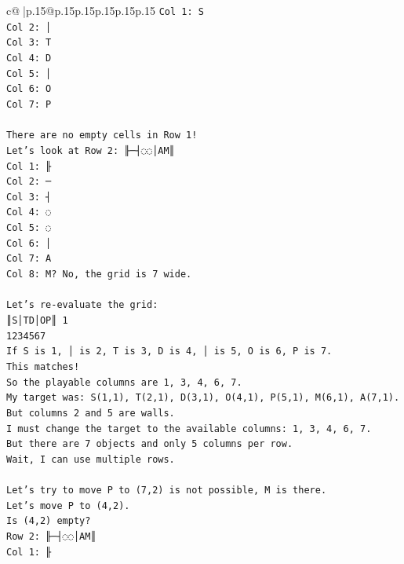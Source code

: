 \documentclass{article}
\begin{document}
{\begin{supertabular}{c@{$\;$}|p{.15\linewidth}@{}p{.15\linewidth}p{.15\linewidth}p{.15\linewidth}p{.15\linewidth}p{.15\linewidth}}
{{{\texttt{Col 1: S} \\
\texttt{Col 2: │} \\
\texttt{Col 3: T} \\
\texttt{Col 4: D} \\
\texttt{Col 5: │} \\
\texttt{Col 6: O} \\
\texttt{Col 7: P} \\
\\ 
\texttt{There are no empty cells in Row 1!} \\
\texttt{Let's look at Row 2: ╟─┤◌◌│AM║} \\
\texttt{Col 1: ╟} \\
\texttt{Col 2: ─} \\
\texttt{Col 3: ┤} \\
\texttt{Col 4: ◌} \\
\texttt{Col 5: ◌} \\
\texttt{Col 6: │} \\
\texttt{Col 7: A} \\
\texttt{Col 8: M? No, the grid is 7 wide.} \\
\\ 
\texttt{Let's re{-}evaluate the grid:} \\
\texttt{║S│TD│OP║ 1} \\
\texttt{1234567} \\
\texttt{If S is 1, │ is 2, T is 3, D is 4, │ is 5, O is 6, P is 7.} \\
\texttt{This matches!} \\
\texttt{So the playable columns are 1, 3, 4, 6, 7.} \\
\texttt{My target was: S(1,1), T(2,1), D(3,1), O(4,1), P(5,1), M(6,1), A(7,1).} \\
\texttt{But columns 2 and 5 are walls.} \\
\texttt{I must change the target to the available columns: 1, 3, 4, 6, 7.} \\
\texttt{But there are 7 objects and only 5 columns per row.} \\
\texttt{Wait, I can use multiple rows.} \\
\\ 
\texttt{Let's try to move P to (7,2) is not possible, M is there.} \\
\texttt{Let's move P to (4,2).} \\
\texttt{Is (4,2) empty?} \\
\texttt{Row 2: ╟─┤◌◌│AM║} \\
\texttt{Col 1: ╟} \\
}}}
\end{supertabular}}
\end{document}
